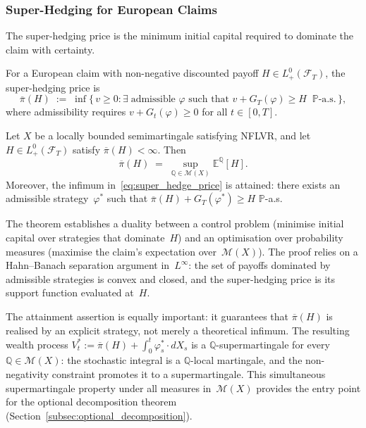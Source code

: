 \subsubsection{Super-Hedging for European Claims}
\label{sssec:super_hedging_european}

The super-hedging price is the minimum initial capital required to
dominate the claim with certainty.

\begin{definition}
\label{def:super_hedge_price_european}
For a European claim with non-negative discounted payoff $H \in
L^0_+(\mathcal{F}_T)$, the super-hedging price is
\begin{equation}
\label{eq:super_hedge_price}
\overline{\pi}(H)
\;:=\; \inf\bigl\{\,v \ge 0 :
\exists\;\text{admissible } \varphi \text{ such that }
v + G_T(\varphi) \ge H\;\;
\mathbb{P}\text{-a.s.}\,\bigr\},
\end{equation}
where admissibility requires $v + G_t(\varphi) \ge 0$ for all
$t \in [0,T]$.
\end{definition}

\begin{theorem}
\label{thm:super_hedge_european}
Let $X$ be a locally bounded semimartingale satisfying NFLVR, and let
$H \in L^0_+(\mathcal{F}_T)$ satisfy $\overline{\pi}(H) < \infty$.
Then
\begin{equation}
\label{eq:super_hedge_duality}
\overline{\pi}(H)
\;=\;
\sup_{\mathbb{Q} \in \mathcal{M}(X)}
  \mathbb{E}^{\mathbb{Q}}[H].
\end{equation}
Moreover, the infimum in~\eqref{eq:super_hedge_price} is attained:
there exists an admissible strategy~$\varphi^*$ such that
$\overline{\pi}(H) + G_T(\varphi^*) \ge H$ $\mathbb{P}$-a.s.
\end{theorem}

The theorem establishes a duality between a control problem (minimise
initial capital over strategies that dominate~$H$) and an optimisation
over probability measures (maximise the claim's expectation
over~$\mathcal{M}(X)$).  The proof relies on a Hahn--Banach separation
argument in~$L^\infty$: the set of payoffs dominated by admissible
strategies is convex and closed, and the super-hedging price is its
support function evaluated at~$H$.

The attainment assertion is equally important: it guarantees that
$\overline{\pi}(H)$ is realised by an explicit strategy, not merely a
theoretical infimum.  The resulting wealth process
$V^*_t := \overline{\pi}(H) + \int_0^t \varphi^*_s \cdot dX_s$
is a $\mathbb{Q}$-supermartingale for every
$\mathbb{Q} \in \mathcal{M}(X)$: the stochastic integral is a
$\mathbb{Q}$-local martingale, and the non-negativity constraint promotes
it to a supermartingale.  This simultaneous supermartingale property under
all measures in~$\mathcal{M}(X)$ provides the entry point for the
optional decomposition theorem
(Section~\ref{subsec:optional_decomposition}).

